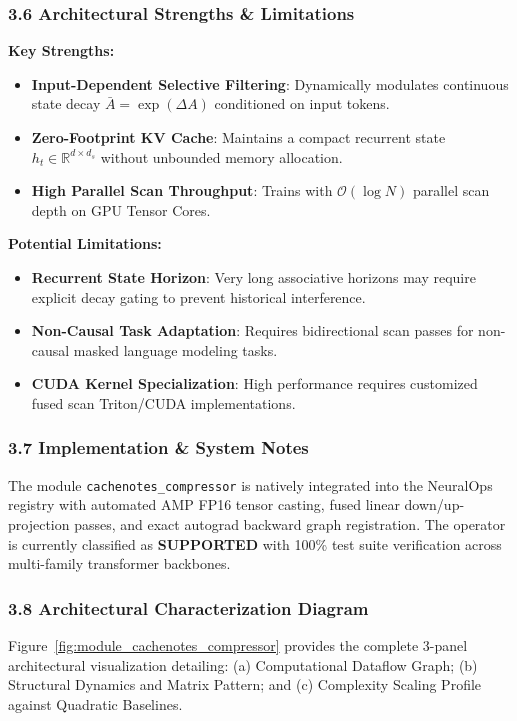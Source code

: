 \subsubsection*{3.6 Architectural Strengths \& Limitations}
\textbf{Key Strengths:}
\begin{itemize}
    \item \textbf{Input-Dependent Selective Filtering}: Dynamically modulates continuous state decay $\bar{A} = \exp(\Delta A)$ conditioned on input tokens.
    \item \textbf{Zero-Footprint KV Cache}: Maintains a compact recurrent state $h_t \in \mathbb{R}^{d \times d_s}$ without unbounded memory allocation.
    \item \textbf{High Parallel Scan Throughput}: Trains with $\mathcal{O}(\log N)$ parallel scan depth on GPU Tensor Cores.
\end{itemize}

\textbf{Potential Limitations:}
\begin{itemize}
    \item \textbf{Recurrent State Horizon}: Very long associative horizons may require explicit decay gating to prevent historical interference.
    \item \textbf{Non-Causal Task Adaptation}: Requires bidirectional scan passes for non-causal masked language modeling tasks.
    \item \textbf{CUDA Kernel Specialization}: High performance requires customized fused scan Triton/CUDA implementations.
\end{itemize}

\subsubsection*{3.7 Implementation \& System Notes}
The module \texttt{cachenotes\_compressor} is natively integrated into the NeuralOps registry with automated AMP FP16 tensor casting, fused linear down/up-projection passes, and exact autograd backward graph registration. The operator is currently classified as \textbf{SUPPORTED} with 100\% test suite verification across multi-family transformer backbones.

\subsubsection*{3.8 Architectural Characterization Diagram}
Figure~\ref{fig:module_cachenotes_compressor} provides the complete 3-panel architectural visualization detailing: (a) Computational Dataflow Graph; (b) Structural Dynamics and Matrix Pattern; and (c) Complexity Scaling Profile against Quadratic Baselines.


